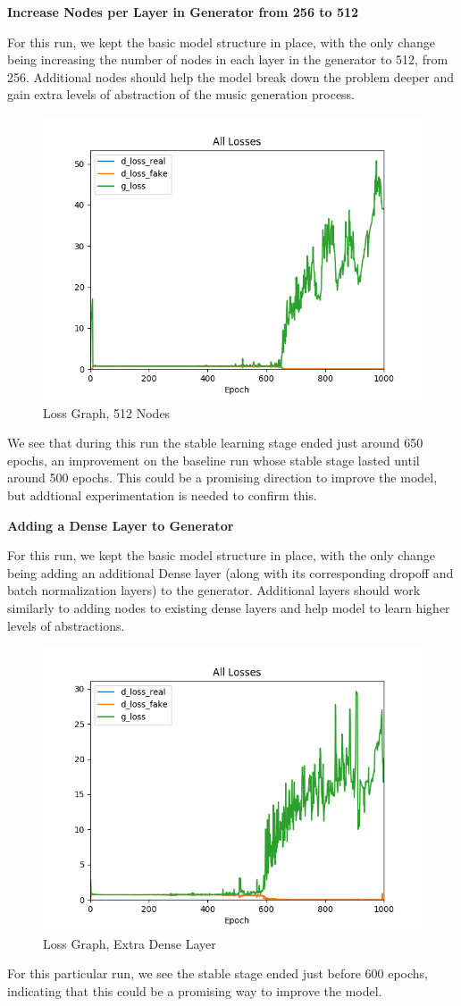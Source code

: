 \documentclass[12pt,oneside]{chicagocapstone}
\begin{document}
\textbf{Increase Nodes per Layer in Generator from 256 to 512}

For this run, we kept the basic model structure in place, with the only change being increasing the number of nodes in each layer in the generator to 512, from 256. Additional nodes should help the model break down the problem deeper and gain extra levels of abstraction of the music generation process.
\begin{figure}

{\centering \includegraphics[width=0.3\linewidth]{figure/ap_512} 

}

\caption{Loss Graph, 512 Nodes}\label{fig:unnamed-chunk-10}
\end{figure}
We see that during this run the stable learning stage ended just around 650 epochs, an improvement on the baseline run whose stable stage lasted until around 500 epochs. This could be a promising direction to improve the model, but addtional experimentation is needed to confirm this.

\textbf{Adding a Dense Layer to Generator}

For this run, we kept the basic model structure in place, with the only change being adding an additional Dense layer (along with its corresponding dropoff and batch normalization layers) to the generator. Additional layers should work similarly to adding nodes to existing dense layers and help model to learn higher levels of abstractions.
\begin{figure}

{\centering \includegraphics[width=0.3\linewidth]{figure/ap_1pluslayer} 

}

\caption{Loss Graph, Extra Dense Layer}\label{fig:unnamed-chunk-11}
\end{figure}
For this particular run, we see the stable stage ended just before 600 epochs, indicating that this could be a promising way to improve the model.
\end{document}
